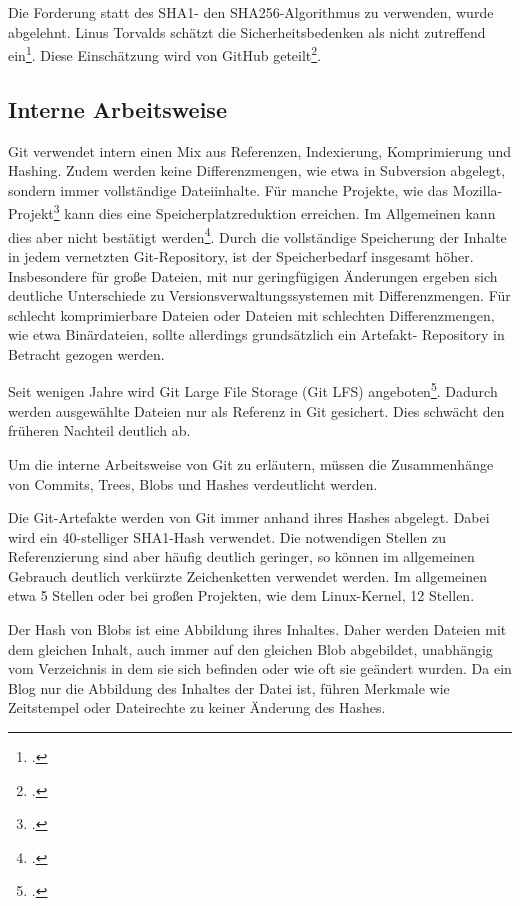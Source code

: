 Die Forderung statt des SHA1- den SHA256-Algorithmus zu verwenden, wurde abgelehnt. Linus Torvalds schätzt die Sicherheitsbedenken als nicht zutreffend ein\footcite[vgl.][]{git-sha-torvalds}. Diese 
Einschätzung wird von GitHub geteilt\footcite[vgl.][]{git-sha-github}.

\subsection{Interne Arbeitsweise}

Git verwendet intern einen Mix aus Referenzen, Indexierung, Komprimierung und Hashing. Zudem werden keine 
Differenzmengen, wie etwa in Subversion abgelegt, sondern immer vollständige Dateiinhalte. Für manche Projekte, wie das 
Mozilla-Projekt\footcite[vgl.][]{kernel-git-svn} kann dies eine Speicherplatzreduktion erreichen. Im Allgemeinen kann dies aber nicht bestätigt werden\footcite[vgl.][]{svn-vs-git}. Durch die vollständige Speicherung der Inhalte in jedem vernetzten Git-Repository, ist der Speicherbedarf insgesamt höher. Insbesondere für große Dateien, mit nur geringfügigen Änderungen ergeben sich deutliche Unterschiede zu Versionsverwaltungssystemen mit Differenzmengen. Für schlecht komprimierbare Dateien oder Dateien mit schlechten Differenzmengen, wie etwa Binärdateien, sollte allerdings grundsätzlich ein Artefakt-
Repository in Betracht gezogen werden. 

Seit wenigen Jahre wird \glqq Git Large File Storage\grqq{} (Git LFS) angeboten\footcite{git-lfs}. Dadurch werden ausgewählte Dateien nur als Referenz in Git gesichert. Dies schwächt den früheren Nachteil deutlich ab.

Um die interne Arbeitsweise von Git zu erläutern, müssen die Zusammenhänge von Commits, Trees, Blobs und Hashes 
verdeutlicht werden.

Die Git-Artefakte werden von Git immer anhand ihres Hashes abgelegt. Dabei wird ein 40-stelliger SHA1-Hash verwendet. Die 
notwendigen Stellen zu Referenzierung sind aber häufig deutlich geringer, so können im allgemeinen Gebrauch deutlich 
verkürzte Zeichenketten verwendet werden. Im allgemeinen etwa 5 Stellen oder bei großen Projekten, wie dem Linux-Kernel, 
12 Stellen.

Der Hash von Blobs ist eine Abbildung ihres Inhaltes. Daher werden Dateien mit dem gleichen Inhalt, auch immer auf den 
gleichen Blob abgebildet, unabhängig vom Verzeichnis in dem sie sich befinden oder wie oft sie geändert wurden. Da ein 
Blog nur die Abbildung des Inhaltes der Datei ist, führen Merkmale wie Zeitstempel oder Dateirechte zu keiner Änderung 
des Hashes.

